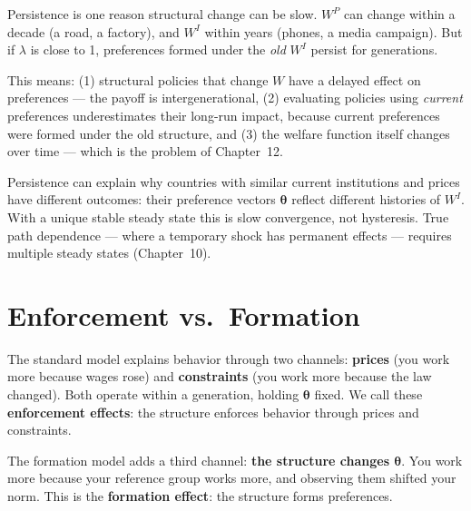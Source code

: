 \documentclass[../structural_economics_book.tex]{subfiles}
\begin{document}
\begin{keyinsight}
Persistence is one reason structural change can be slow. $W^P$ can change within a decade (a road, a factory), and $W^I$ within years (phones, a media campaign). But if $\lambda$ is close to 1, preferences formed under the \textit{old} $W^I$ persist for generations.

This means: (1) structural policies that change $W$ have a delayed effect on preferences --- the payoff is intergenerational, (2) evaluating policies using \textit{current} preferences underestimates their long-run impact, because current preferences were formed under the old structure, and (3) the welfare function itself changes over time --- which is the problem of Chapter~12.

Persistence can explain why countries with similar current institutions and prices have different outcomes: their preference vectors $\boldsymbol{\theta}$ reflect different histories of $W^I$. With a unique stable steady state this is slow convergence, not hysteresis. True path dependence --- where a temporary shock has permanent effects --- requires multiple steady states (Chapter~10).
\end{keyinsight}


\section{Enforcement vs.\ Formation}
\label{ch09:sec:enforcement_formation}

The standard model explains behavior through two channels: \textbf{prices} (you work more because wages rose) and \textbf{constraints} (you work more because the law changed). Both operate within a generation, holding $\boldsymbol{\theta}$ fixed. We call these \textbf{enforcement effects}: the structure enforces behavior through prices and constraints.

The formation model adds a third channel: \textbf{the structure changes $\boldsymbol{\theta}$}. You work more because your reference group works more, and observing them shifted your norm. This is the \textbf{formation effect}: the structure forms preferences.
\end{document}
